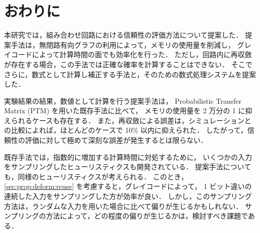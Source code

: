 \chapter{おわりに}\label{sec:conclusion}

本研究では，組み合わせ回路における信頼性の評価方法について提案した．
提案手法は，無閉路有向グラフの利用によって，メモリの使用量を削減し，
グレイコードによって計算時間の面でも効率化を行った．
ただし，回路内に再収斂が存在する場合，この手法では正確な確率を計算することはできない．
そこでさらに，数式として計算し補正する手法と，そのための数式処理システムを提案した．

実験結果の結果，数値として計算を行う提案手法は，
Probabilistic Transfer Matrix (PTM) を用いた既存手法に比べて，
メモリの使用量を 2 万分の 1 に抑えられるケースも存在する．
また，再収斂による誤差は，シミュレーションとの比較によれば，ほとんどのケースで 10\% 以内に抑えられた．
したがって，信頼性の評価に対して極めて深刻な誤差が発生するとは限らない．




既存手法では，指数的に増加する計算時間に対処するために，
いくつかの入力をサンプリングしたヒューリスティクスも開発されている．
提案手法についても，同様のヒューリスティクスが考えられる．
このとき，\ref{sec:prop:deform:reuse} を考慮すると，グレイコードによって，
1 ビット違いの連続した入力をサンプリングした方が効率が良い．
しかし，このサンプリング方法は，ランダムな入力を用いた場合に比べて偏りが生じるかもしれない．
サンプリングの方法によって，どの程度の偏りが生じるかは，検討すべき課題である．


